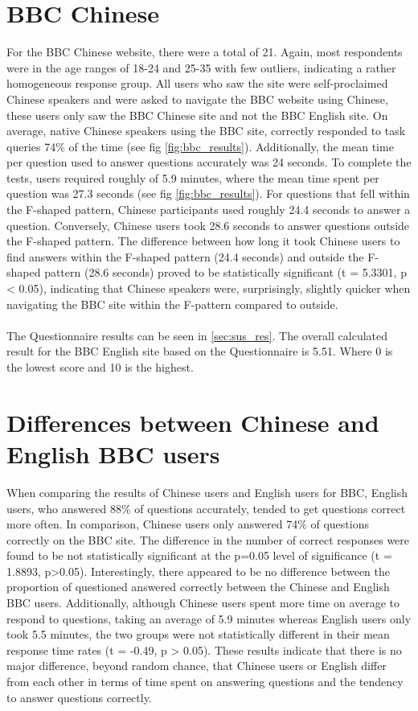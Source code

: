 \section{BBC Chinese}
For the BBC Chinese website, there were a total of 21. Again, most respondents were in the age ranges of 18-24 and 25-35 with few outliers, indicating a rather homogeneous response group. All users who saw the site were self-proclaimed Chinese speakers and were asked to navigate the BBC website using Chinese, these users only saw the BBC Chinese site and not the BBC English site. On average, native Chinese speakers using the BBC site, correctly responded to task queries 74\% of the time (see fig \ref{fig:bbc_results}). Additionally, the mean time per question used to answer questions accurately was 24 seconds. To complete the tests, users required roughly of 5.9 minutes, where the mean time spent per question was 27.3 seconds (see fig \ref{fig:bbc_results}). For questions that fell within the F-shaped pattern, Chinese participants used roughly 24.4 seconds to answer a question. Conversely, Chinese users took 28.6 seconds to answer questions outside the F-shaped pattern. The difference between how long it took Chinese users to find answers within the F-shaped pattern (24.4 seconds) and outside the F-shaped pattern (28.6 seconds) proved to be statistically significant (t = 5.3301, p < 0.05), indicating that Chinese speakers were, surprisingly, slightly quicker when navigating the BBC site within the F-pattern compared to outside. 
\\\\
The Questionnaire results can be seen in \ref{sec:sus_res}. The overall calculated result for the BBC English site based on the Questionnaire is 5.51. Where 0 is the lowest score and 10 is the highest.

\section{Differences between Chinese and English BBC users
}
When comparing the results of Chinese users and English users for BBC, English users, who answered 88\% of questions accurately, tended to get questions correct more often. In comparison, Chinese users only answered 74\% of questions correctly on the BBC site. The difference in the number of correct responses were found to be not statistically significant at the p=0.05 level of significance (t = 1.8893, p>0.05). Interestingly, there appeared to be no difference between the proportion of questioned answered correctly between the Chinese and English BBC users. Additionally, although Chinese users spent more time on average to respond to questions, taking an average of 5.9 minutes whereas English users only took 5.5 minutes, the two groups were not statistically different in their mean response time rates (t = -0.49, p > 0.05). These results indicate that there is no major difference, beyond random chance, that Chinese users or English differ from each other in terms of time spent on answering questions and the tendency to answer questions correctly. 

